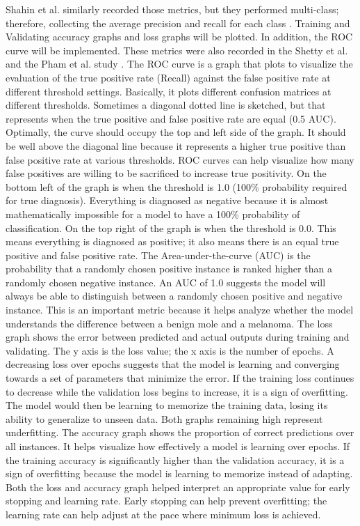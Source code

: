 \documentclass[10pt,twocolumn]{article}
\begin{document}
Shahin et al. similarly recorded those metrics, but they performed multi-class; therefore, collecting the average precision and recall for each class \cite{shahin2018deep}.
Training and Validating accuracy graphs and loss graphs will be plotted. In addition, the ROC curve will be implemented. These metrics were also recorded in the Shetty et al. and the Pham et al. study \cite{pham2021ai}.
The ROC curve is a graph that plots to visualize the evaluation of the true positive rate (Recall) against the false positive rate at different threshold settings. Basically, it plots different confusion matrices at different thresholds. Sometimes a diagonal dotted line is sketched, but that represents when the true positive and false positive rate are equal (0.5 AUC). Optimally, the curve should occupy the top and left side of the graph. It should be well above the diagonal line because it represents a higher true positive than false positive rate at various thresholds. ROC curves can help visualize how many false positives are willing to be sacrificed to increase true positivity. On the bottom left of the graph is when the threshold is 1.0 (100\% probability required for true diagnosis). Everything is diagnosed as negative because it is almost mathematically impossible for a model to have a 100\% probability of classification. On the top right of the graph is when the threshold is 0.0. This means everything is diagnosed as positive; it also means there is an equal true positive and false positive rate. The Area-under-the-curve (AUC) is the probability that a randomly chosen positive instance is ranked higher than a randomly chosen negative instance. An AUC of 1.0 suggests the model will always be able to distinguish between a randomly chosen positive and negative instance. This is an important metric because it helps analyze whether the model understands the difference between a benign mole and a melanoma. \newline \newline
The loss graph shows the error between predicted and actual outputs during training and validating. The y axis is the loss value; the x axis is the number of epochs. A decreasing loss over epochs suggests that the model is learning and converging towards a set of parameters that minimize the error. If the training loss continues to decrease while the validation loss begins to increase, it is a sign of overfitting. The model would then be learning to memorize the training data, losing its ability to generalize to unseen data. Both graphs remaining high represent underfitting. \newline
The accuracy graph shows the proportion of correct predictions over all instances. It helps visualize how effectively a model is learning over epochs. If the training accuracy is significantly higher than the validation accuracy, it is a sign of overfitting because the model is learning to memorize instead of adapting. 
\newline
Both the loss and accuracy graph helped interpret an appropriate value for early stopping and learning rate. Early stopping can help prevent overfitting; the learning rate can help adjust at the pace where minimum loss is achieved. 
\end{document}
